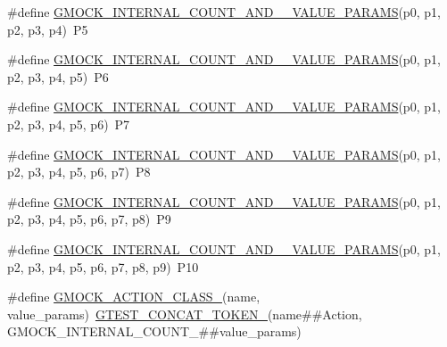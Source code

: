 \begin{DoxyCompactItemize}
\item 
\#define \mbox{\hyperlink{_obj__test_2lib_2googletest-master_2googlemock_2include_2gmock_2gmock-generated-actions_8h_a29d90b8cedec75d4acbf2df27ef0e3b5}{G\+M\+O\+C\+K\+\_\+\+I\+N\+T\+E\+R\+N\+A\+L\+\_\+\+C\+O\+U\+N\+T\+\_\+\+A\+N\+D\+\_\+\_\+\+V\+A\+L\+U\+E\+\_\+\+P\+A\+R\+A\+MS}}(p0,  p1,  p2,  p3,  p4)~P5
\item 
\#define \mbox{\hyperlink{_obj__test_2lib_2googletest-master_2googlemock_2include_2gmock_2gmock-generated-actions_8h_ab79feaedfcef7df29e87695b82e9b65d}{G\+M\+O\+C\+K\+\_\+\+I\+N\+T\+E\+R\+N\+A\+L\+\_\+\+C\+O\+U\+N\+T\+\_\+\+A\+N\+D\+\_\+\_\+\+V\+A\+L\+U\+E\+\_\+\+P\+A\+R\+A\+MS}}(p0,  p1,  p2,  p3,  p4,  p5)~P6
\item 
\#define \mbox{\hyperlink{_obj__test_2lib_2googletest-master_2googlemock_2include_2gmock_2gmock-generated-actions_8h_ab4b49f0cdb482c0d7a6249607ac44f24}{G\+M\+O\+C\+K\+\_\+\+I\+N\+T\+E\+R\+N\+A\+L\+\_\+\+C\+O\+U\+N\+T\+\_\+\+A\+N\+D\+\_\+\_\+\+V\+A\+L\+U\+E\+\_\+\+P\+A\+R\+A\+MS}}(p0,  p1,  p2,  p3,  p4,  p5,  p6)~P7
\item 
\#define \mbox{\hyperlink{_obj__test_2lib_2googletest-master_2googlemock_2include_2gmock_2gmock-generated-actions_8h_a461b026c9cc310c199ab1f0b59111e5a}{G\+M\+O\+C\+K\+\_\+\+I\+N\+T\+E\+R\+N\+A\+L\+\_\+\+C\+O\+U\+N\+T\+\_\+\+A\+N\+D\+\_\+\_\+\+V\+A\+L\+U\+E\+\_\+\+P\+A\+R\+A\+MS}}(p0,  p1,  p2,  p3,  p4,  p5,  p6,  p7)~P8
\item 
\#define \mbox{\hyperlink{_obj__test_2lib_2googletest-master_2googlemock_2include_2gmock_2gmock-generated-actions_8h_a425b81bf1cdf7cd14d1e0184df9f204f}{G\+M\+O\+C\+K\+\_\+\+I\+N\+T\+E\+R\+N\+A\+L\+\_\+\+C\+O\+U\+N\+T\+\_\+\+A\+N\+D\+\_\+\_\+\+V\+A\+L\+U\+E\+\_\+\+P\+A\+R\+A\+MS}}(p0,  p1,  p2,  p3,  p4,  p5,  p6,  p7,  p8)~P9
\item 
\#define \mbox{\hyperlink{_obj__test_2lib_2googletest-master_2googlemock_2include_2gmock_2gmock-generated-actions_8h_abfe1adfe26341b5270a8d3385035c464}{G\+M\+O\+C\+K\+\_\+\+I\+N\+T\+E\+R\+N\+A\+L\+\_\+\+C\+O\+U\+N\+T\+\_\+\+A\+N\+D\+\_\+\_\+\+V\+A\+L\+U\+E\+\_\+\+P\+A\+R\+A\+MS}}(p0,  p1,  p2,  p3,  p4,  p5,  p6,  p7,  p8,  p9)~P10
\item 
\#define \mbox{\hyperlink{_obj__test_2lib_2googletest-master_2googlemock_2include_2gmock_2gmock-generated-actions_8h_af1442d2b3f80b5d04b409bca938fdcc5}{G\+M\+O\+C\+K\+\_\+\+A\+C\+T\+I\+O\+N\+\_\+\+C\+L\+A\+S\+S\+\_\+}}(name,  value\+\_\+params)~\mbox{\hyperlink{_obj__test_2lib_2googletest-release-1_88_81_2googletest_2include_2gtest_2internal_2gtest-internal_8h_ae3c336cbe1ae2bd1b1d019333e4428a0}{G\+T\+E\+S\+T\+\_\+\+C\+O\+N\+C\+A\+T\+\_\+\+T\+O\+K\+E\+N\+\_\+}}(name\#\#Action, G\+M\+O\+C\+K\+\_\+\+I\+N\+T\+E\+R\+N\+A\+L\+\_\+\+C\+O\+U\+N\+T\+\_\+\#\#value\+\_\+params)

\end{DoxyCompactItemize}
